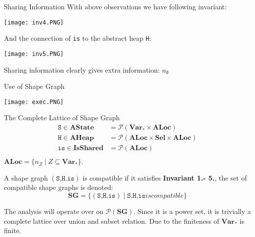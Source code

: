 \documentclass[aspectratio=1610, 13pt]{beamer}
\begin{document}
\begin{frame}{Sharing Information}
    With above observations we have following invariant:
    \begin{center}
        \texttt{[image: inv4.PNG]}
    \end{center}
    
    And the connection of \texttt{is} to the abstract heap \texttt{H}:
    \begin{center}
        \texttt{[image: inv5.PNG]}
    \end{center}
    
    Sharing information clearly gives extra information: $n_\emptyset$
\end{frame}

\begin{frame}{Use of Shape Graph}

    \begin{center}
        \texttt{[image: exec.PNG]}
    \end{center}

\end{frame}

\begin{frame}{The Complete Lattice of Shape Graph}
\begin{align*}
            \texttt{S}\in \mathbf{AState} &= \mathcal{P}\mathbf{(Var_*\times ALoc)}\\
            \texttt{H}\in \mathbf{AHeap} &= \mathcal{P}\mathbf{(ALoc \times Sel\times ALoc)}\\
            \texttt{is} \in \mathbf{IsShared} &= \mathcal{P}\mathbf{(ALoc)}\\
\end{align*}
$\mathbf{ALoc} = \{n_Z\mid Z \subseteq \mathbf{Var}_*\}$. 

A shape graph $(\texttt{S,H,is})$ is compatible if it satisfies \textbf{Invariant 1.- 5.}, the set of compatible shape graphs is denoted:
\[\mathbf{SG} = \{(\texttt{S,H,is}) \mid \texttt{S,H,is} is compatible\}\]

The analysis will operate over on $\mathcal{P}(\mathbf{SG})$. Since it is a power set, it is trivially a complete lattice over union and subset relation. Due to the finiteness of $\mathbf{Var}_*$ is finite.
\end{frame}
\end{document}
